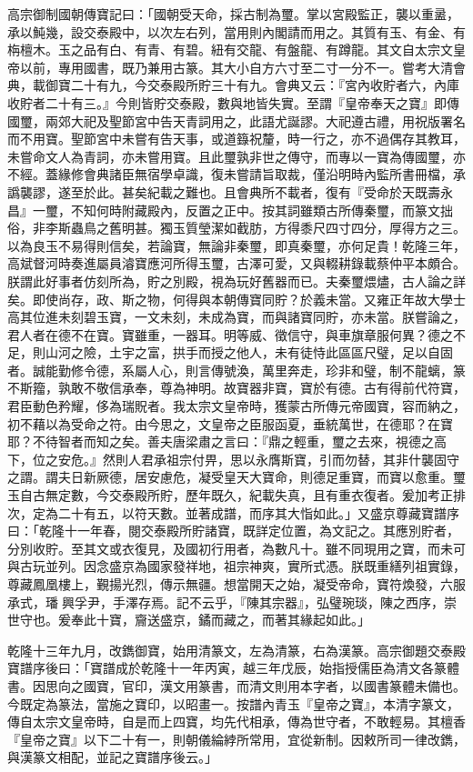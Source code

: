 \begin{pinyinscope}
高宗御制國朝傳寶記曰：「國朝受天命，採古制為璽。掌以宮殿監正，襲以重盝，承以魨幾，設交泰殿中，以次左右列，當用則內閣請而用之。其質有玉、有金、有栴檀木。玉之品有白、有青、有碧。紐有交龍、有盤龍、有蹲龍。其文自太宗文皇帝以前，專用國書，既乃兼用古篆。其大小自方六寸至二寸一分不一。嘗考大清會典，載御寶二十有九，今交泰殿所貯三十有九。會典又云：『宮內收貯者六，內庫收貯者二十有三。』今則皆貯交泰殿，數與地皆失實。至謂『皇帝奉天之寶』即傳國璽，兩郊大祀及聖節宮中告天青詞用之，此語尤誕謬。大祀遵古禮，用祝版署名而不用寶。聖節宮中未嘗有告天事，或道籙祝釐，時一行之，亦不過偶存其教耳，未嘗命文人為青詞，亦未嘗用寶。且此璽孰非世之傳守，而專以一寶為傳國璽，亦不經。蓋緣修會典諸臣無宿學卓識，復未嘗請旨取裁，僅沿明時內監所書冊檔，承譌襲謬，遂至於此。甚矣紀載之難也。且會典所不載者，復有『受命於天既壽永昌』一璽，不知何時附藏殿內，反置之正中。按其詞雖類古所傳秦璽，而篆文拙俗，非李斯蟲鳥之舊明甚。獨玉質瑩潔如截肪，方得黍尺四寸四分，厚得方之三。以為良玉不易得則信矣，若論寶，無論非秦璽，即真秦璽，亦何足貴！乾隆三年，高斌督河時奏進屬員濬寶應河所得玉璽，古澤可愛，又與輟耕錄載蔡仲平本頗合。朕謂此好事者仿刻所為，貯之別殿，視為玩好舊器而已。夫秦璽煨燼，古人論之詳矣。即使尚存，政、斯之物，何得與本朝傳寶同貯？於義未當。又雍正年故大學士高其位進未刻碧玉寶，一文未刻，未成為寶，而與諸寶同貯，亦未當。朕嘗論之，君人者在德不在寶。寶雖重，一器耳。明等威、徵信守，與車旗章服何異？德之不足，則山河之險，土宇之富，拱手而授之他人，未有徒恃此區區尺璧，足以自固者。誠能勤修令德，系屬人心，則言傳號渙，萬里奔走，珍非和璧，制不龍螭，篆不斯籀，孰敢不敬信承奉，尊為神明。故寶器非寶，寶於有德。古有得前代符寶，君臣動色矜耀，侈為瑞貺者。我太宗文皇帝時，獲蒙古所傳元帝國寶，容而納之，初不藉以為受命之符。由今思之，文皇帝之臣服函夏，垂統萬世，在德耶？在寶耶？不待智者而知之矣。善夫唐梁肅之言曰：『鼎之輕重，璽之去來，視德之高下，位之安危。』然則人君承祖宗付畀，思以永膺斯寶，引而勿替，其非什襲固守之謂。謂夫日新厥德，居安慮危，凝受皇天大寶命，則德足重寶，而寶以愈重。璽玉自古無定數，今交泰殿所貯，歷年既久，紀載失真，且有重衣復者。爰加考正排次，定為二十有五，以符天數。並著成譜，而序其大恉如此。」又盛京尊藏寶譜序曰：「乾隆十一年春，閱交泰殿所貯諸寶，既詳定位置，為文記之。其應別貯者，分別收貯。至其文或衣復見，及國初行用者，為數凡十。雖不同現用之寶，而未可與古玩並列。因念盛京為國家發祥地，祖宗神爽，實所式憑。朕既重繕列祖實錄，尊藏鳳凰樓上，覲揚光烈，傳示無疆。想當開天之始，凝受帝命，寶符煥發，六服承式，璠興孚尹，手澤存焉。記不云乎，『陳其宗器』，弘璧琬琰，陳之西序，崇世守也。爰奉此十寶，齎送盛京，鐍而藏之，而著其緣起如此。」

乾隆十三年九月，改鐫御寶，始用清篆文，左為清篆，右為漢篆。高宗御題交泰殿寶譜序後曰：「寶譜成於乾隆十一年丙寅，越三年戊辰，始指授儒臣為清文各篆體書。因思向之國寶，官印，漢文用篆書，而清文則用本字者，以國書篆體未備也。今既定為篆法，當施之寶印，以昭畫一。按譜內青玉『皇帝之寶』，本清字篆文，傳自太宗文皇帝時，自是而上四寶，均先代相承，傳為世守者，不敢輕易。其檀香『皇帝之寶』以下二十有一，則朝儀綸綍所常用，宜從新制。因敕所司一律改鐫，與漢篆文相配，並記之寶譜序後云。」


\end{pinyinscope}
